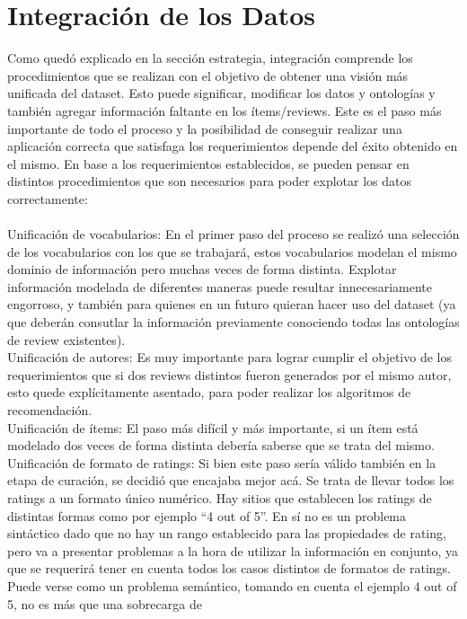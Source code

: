 \chapter{Integración de los Datos}
\label{chapter:integracion}

Como quedó explicado en la sección estrategia, integración comprende los procedimientos que se realizan con el objetivo de obtener una
visión más unificada del dataset.
Esto puede significar, modificar los datos y ontologías y también agregar información faltante en los ítems/reviews.
Este es el paso más importante de todo el proceso y la posibilidad de conseguir realizar una aplicación correcta que satisfaga los requerimientos
depende del éxito obtenido en el mismo.
En base a los requerimientos establecidos, se pueden pensar en distintos procedimientos que son necesarios para poder explotar los datos
correctamente:
\\
\\
Unificación de vocabularios: En el primer paso del proceso se realizó una selección de los vocabularios con los que se trabajará, 
estos vocabularios modelan el mismo dominio de información pero muchas veces de forma distinta. Explotar información modelada de 
diferentes maneras puede resultar innecesariamente engorroso, y también para quienes en un futuro quieran hacer uso del dataset (ya que
deberán consutlar la información previamente conociendo todas las ontologías de review existentes).\\
Unificación de autores: Es muy importante para lograr cumplir el objetivo de los requerimientos que si dos reviews distintos fueron 
generados por el mismo autor, esto quede explícitamente asentado, para poder realizar los algoritmos de recomendación.\\
Unificación de ítems: El paso más difícil y más importante, si un ítem está modelado dos veces de forma distinta debería saberse que 
se trata del mismo.\\
Unificación de formato de ratings: Si bien este paso sería válido también en la etapa de curación, se decidió que encajaba mejor acá.
Se trata de llevar todos los ratings a un formato único numérico. Hay sitios que establecen los ratings de distintas formas como 
por ejemplo ``4 out of 5''. En sí no es un problema sintáctico dado que no hay un rango establecido para las propiedades de rating, 
pero va a presentar problemas a la hora de utilizar la información en conjunto, ya que se requerirá tener en cuenta todos los casos 
distintos de formatos de ratings. Puede verse como un problema semántico, tomando en cuenta el ejemplo 4 out of 5, no es más que una sobrecarga de 
